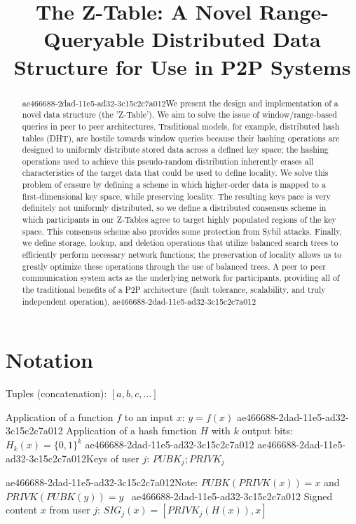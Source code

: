\documentclass[12pt]{article}
\title{The Z-Table: A Novel Range-Queryable Distributed Data Structure for Use in P2P Systems}
\begin{document}
\maketitle

\begin{abstract}
ae466688-2dad-11e5-ad32-3c15c2c7a012We present the design and implementation of a novel data structure (the 'Z-Table'). We aim to solve the issue of window/range-based queries in peer to peer architectures. Traditional models, for example,  distributed hash tables (DHT), are hostile towards window queries because their hashing operations are designed to uniformly distribute stored data across a defined key space; the hashing operations used to achieve this pseudo-random distribution inherently erases all characteristics of the target data that could be used to define locality. We solve this problem of erasure by defining a scheme in which higher-order data is mapped to a first-dimensional key space, while preserving locality. The resulting keys pace is very definitely not uniformly distributed, so we define a distributed consensus scheme in which participants in our Z-Tables agree to target highly populated regions of the key space. This consensus scheme also provides some protection from Sybil attacks. Finally, we define storage, lookup, and deletion operations that utilize balanced search trees to efficiently perform necessary network functions; the preservation of locality allows us to greatly optimize these operations through the use of balanced trees. A peer to peer communication system acts as the underlying network for participants, providing all of the traditional benefits of a P2P architecture (fault tolerance, scalability, and truly independent operation).
ae466688-2dad-11e5-ad32-3c15c2c7a012\end{abstract}

\section{Notation}

Tuples (concatenation): $[a,b,c,...]$

Application of a function $f$ to an input $x$: $y=f(x)$
ae466688-2dad-11e5-ad32-3c15c2c7a012
Application of a hash function $H$ with $k$ output bits: $H_{k}(x) = \{0,1\}^k$
ae466688-2dad-11e5-ad32-3c15c2c7a012
ae466688-2dad-11e5-ad32-3c15c2c7a012Keys of user $j$: $ PUBK_j; PRIVK_j $

ae466688-2dad-11e5-ad32-3c15c2c7a012Note: $PUBK(PRIVK(x)) = x$ and $PRIVK(PUBK(y)) = y$~
ae466688-2dad-11e5-ad32-3c15c2c7a012
Signed content $x$ from user $j$: $SIG_j(x) = \left[ PRIVK_j( H(x) ), x \right]$
\end{document}
